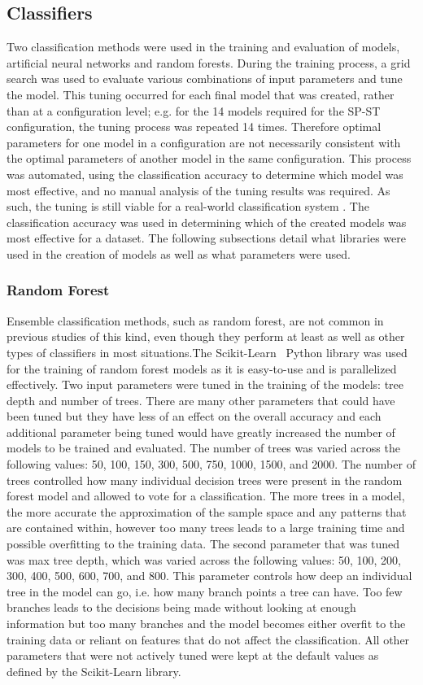 \documentclass[11pt]{article}
\begin{document}
	\subsection{Classifiers}
	Two classification methods were used in the training and evaluation of models, artificial neural networks and random forests. During the training process, a grid search was used to evaluate various combinations of input parameters and tune the model. This tuning occurred for each final model that was created, rather than at a configuration level; e.g. for the 14 models required for the SP-ST configuration, the tuning process was repeated 14 times. Therefore optimal parameters for one model in a configuration are not necessarily consistent with the optimal parameters of another model in the same configuration. This process was automated, using the classification accuracy to determine which model was most effective, and no manual analysis of the tuning results was required. As such, the tuning is still viable for a real-world classification system . The classification accuracy was used in determining which of the created models was most effective for a dataset.  The following subsections detail what libraries were used in the creation of models as well as what parameters were used. 

		\subsubsection{Random Forest}
		Ensemble classification methods, such as random forest, are not common in previous studies of this kind, even though they perform at least as well as other types of classifiers in most situations.The Scikit-Learn~\cite{Scikit} Python library was used for the training of random forest models as it is easy-to-use and is parallelized effectively. Two input parameters were tuned in the training of the models: tree depth and number of trees. There are many other parameters that could have been tuned but they have less of an effect on the overall accuracy and each additional parameter being tuned would have greatly increased the number of models to be trained and evaluated. The number of trees was varied across the following values: 50, 100, 150, 300, 500, 750, 1000, 1500, and 2000. The number of trees controlled how many individual decision trees were present in the random forest model and allowed to vote for a classification. The more trees in a model, the more accurate the approximation of the sample space and any patterns that are contained within, however too many trees leads to a large training time and possible overfitting to the training data. The second parameter that was tuned was max tree depth, which was varied across the following values: 50, 100, 200, 300, 400, 500, 600, 700, and 800. This parameter controls how deep an individual tree in the model can go, i.e. how many branch points a tree can have. Too few branches leads to the decisions being made without looking at enough information but too many branches and the model becomes either overfit to the training data or reliant on features that do not affect the classification. All other parameters that were not actively tuned were kept at the default values as defined by the Scikit-Learn library.
		
\end{document}
